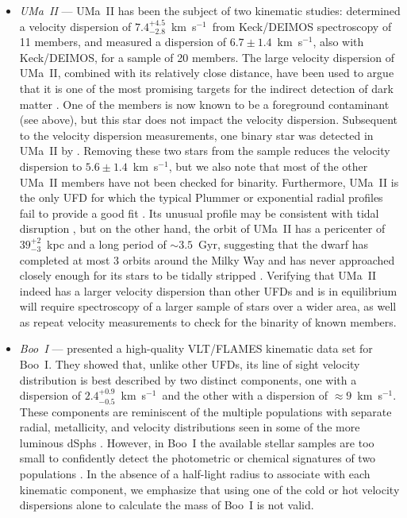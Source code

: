 \documentclass[a4paper]{ar-1col}
\newcommand{\kms}         {km~s$^{-1}$}
\begin{document}
\begin{itemize}
\item \emph{UMa~II} --- UMa~II has been the subject of two kinematic
  studies: \citet{martin07} determined a velocity dispersion of
  $7.4^{+4.5}_{-2.8}$~\kms\ from Keck/DEIMOS spectroscopy of 11
  members, and \citet{sg07} measured a dispersion of $6.7 \pm
  1.4$~\kms, also with Keck/DEIMOS, for a sample of 20 members.  The
  large velocity dispersion of UMa~II, combined with its relatively
  close distance, have been used to argue that it is one of the most
  promising targets for the indirect detection of dark matter
  \citep[e.g.,][]{ahnen18}.  One of the \citeauthor{sg07} members is
  now known to be a foreground contaminant (see above), but this star
  does not impact the velocity dispersion.  Subsequent to the velocity
  dispersion measurements, one binary star was detected in UMa~II by
  \citet{frebel10}.  Removing these two stars from the sample reduces
  the velocity dispersion to $5.6 \pm 1.4$~\kms, but we also note that
  most of the other UMa~II members have not been checked for binarity.
  Furthermore, UMa~II is the only UFD for which the typical Plummer or
  exponential radial profiles fail to provide a good fit
  \citep{munoz10,munoz18b}.  Its unusual profile may be consistent
  with tidal disruption \citep*{munoz10}, but on the other hand, the
  orbit of UMa~II has a pericenter of $39^{+2}_{-3}$~kpc and a long
  period of $\sim3.5$~Gyr, suggesting that the dwarf has completed at
  most 3 orbits around the Milky Way and has never approached closely
  enough for its stars to be tidally stripped \citep{simon18}.
  Verifying that UMa~II indeed has a larger velocity dispersion than
  other UFDs and is in equilibrium will require spectroscopy of a
  larger sample of stars over a wider area, as well as repeat velocity
  measurements to check for the binarity of known members.

\item \emph{Boo~I} --- \citet{koposov11} presented a high-quality
  VLT/FLAMES kinematic data set for Boo~I.  They showed that, unlike
  other UFDs, its line of sight velocity distribution is best
  described by two distinct components, one with a dispersion of
  $2.4^{+0.9}_{-0.5}$~\kms\ and the other with a dispersion of
  $\approx9$~\kms.  These components are reminiscent of the multiple
  populations with separate radial, metallicity, and velocity
  distributions seen in some of the more luminous dSphs
  \citep[e.g.,][]{tolstoy04,battaglia06,battaglia11}.  However, in
  Boo~I the available stellar samples are too small to confidently
  detect the photometric or chemical signatures of two populations
  \citep{koposov11}.  In the absence of a half-light radius to
  associate with each kinematic component, we emphasize that using one
  of the cold or hot velocity dispersions alone to calculate the mass
  of Boo~I is not valid.

\end{itemize}
\end{document}
